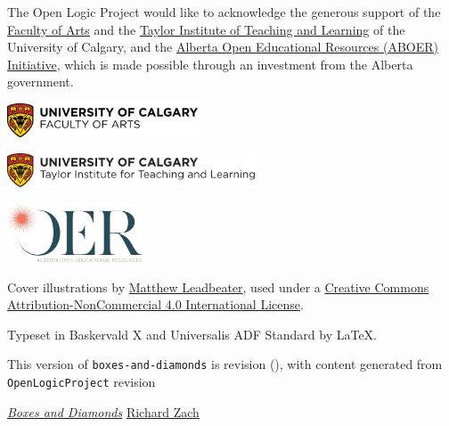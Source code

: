 \newpage


\noindent
The Open Logic Project would like to acknowledge the generous support
of the \href{http://arts.ucalgary.ca/}{Faculty of Arts} and
the \href{http://www.ucalgary.ca/taylorinstitute/}{Taylor Institute of
Teaching and Learning} of the University of Calgary,
and the \href{http://albertaoer.com}{Alberta Open Educational Resources
(ABOER) Initiative}, which is made possible through an investment from
the Alberta government.

\bigskip

\noindent\includegraphics[height=1cm]{assets/ucarts-color}

\medskip

\noindent\includegraphics[height=1cm]{assets/ti-color}

\medskip

\noindent\includegraphics[width=4cm]{assets/aboer-color}

\vfill

\noindent Cover illustrations by \href{http://mattleadbeater.com}{Matthew
  Leadbeater}, used under a
\href{http://creativecommons.org/licenses/by-nc/4.0/}{Creative Commons
  Attribution-NonCommercial 4.0 International License}.

\vfill

\noindent Typeset in Baskervald X and Universalis ADF Standard by
\LaTeX.

\vfill

\noindent This version of \texttt{boxes-and-diamonds} is
revision \gitAbbrevHash{} (\gitAuthorDate), with content generated
from \texttt{OpenLogicProject} revision


\vfill


\renewcommand{\ollicensefont}{\fontsize{8.5pt}{11pt}\selectfont}

\noindent
\oluselicense
{\href{https://github.com/rzach/boxes-and-diamonds}{\textit{Boxes and Diamonds}}}
{\href{http://richardzach.org/}{Richard Zach}}

\newpage
\pagestyle{leadbeater}
\tableofcontents*

